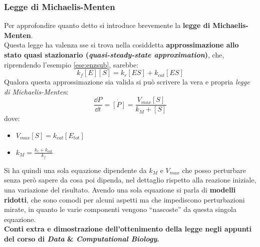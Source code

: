 \documentclass[a4paper,12pt, oneside]{book}
\begin{document}
\subsubsection{Legge di Michaelis-Menten}
Per approfondire quanto detto si introduce brevemente la \textbf{legge di
  Michaelis-Menten}.\\
Questa legge ha valenza sse si trova nella cosiddetta \textbf{approssimazione
  allo stato quasi stazionario (\textit{quasi-steady-state approximation})},
che, riprendendo l'esempio \ref{ese:enzsub}, sarebbe:
\[k_f[E][S]=k_r[ES]+k_{cat}[ES]\]
Qualora questa approssimazione sia valida si può scrivere la vera e propria
\textit{legge di Michaelis-Menten}:
\[\frac{\dd{P}}{\dd{t}}=\dot{[P]}=\frac{V_{max}[S]}{k_M+[S]}\]
dove:
\begin{itemize}
  \item $V_{max}[S]=k_{cat}[E_{tot}]$
  \item $k_M=\frac{k_r+k_{cat}}{k_f}$
\end{itemize}
Si ha quindi una sola equazione dipendente da $k_M$ e $V_{max}$ che posso
perturbare senza però sapere da cosa poi dipenda, nel dettaglio rispetto alla
reazione iniziale, una variazione del risultato. Avendo una sola equazione si
parla di \textbf{modelli ridotti}, che sono comodi per alcuni aspetti ma che
impediscono perturbazioni mirate, in quanto le varie componenti vengono
``nascoste'' da questa singola equazione.\\
\textbf{Conti extra e dimostrazione dell'ottenimento della legge negli appunti
  del corso di\textit{ Data} \& \textit{Computational Biology}.}
\end{document}
